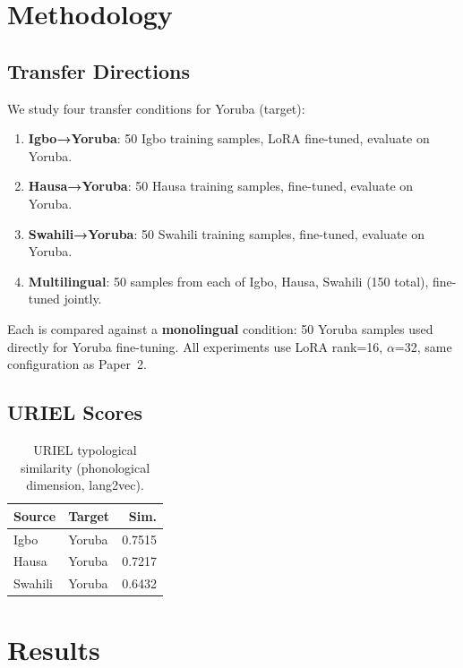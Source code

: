 \documentclass[11pt,a4paper]{article}
\begin{document}
\section{Methodology}
\label{sec:method}

\subsection{Transfer Directions}
We study four transfer conditions for Yoruba (target):
\begin{enumerate}
  \item \textbf{Igbo→Yoruba}: 50 Igbo training samples, LoRA fine-tuned, evaluate on Yoruba.
  \item \textbf{Hausa→Yoruba}: 50 Hausa training samples, fine-tuned, evaluate on Yoruba.
  \item \textbf{Swahili→Yoruba}: 50 Swahili training samples, fine-tuned, evaluate on Yoruba.
  \item \textbf{Multilingual}: 50 samples from each of Igbo, Hausa, Swahili (150 total), fine-tuned jointly.
\end{enumerate}

Each is compared against a \textbf{monolingual} condition: 50 Yoruba samples used directly for Yoruba fine-tuning. All experiments use LoRA rank=16, $\alpha$=32, same configuration as Paper~2.

\subsection{URIEL Scores}

\begin{table}[t]
\centering
\small
\caption{URIEL typological similarity (phonological dimension, lang2vec).}
\label{tab:uriel_full}
\begin{tabular}{llr}
\toprule
\textbf{Source} & \textbf{Target} & \textbf{Sim.} \\
\midrule
Igbo    & Yoruba  & 0.7515 \\
Hausa   & Yoruba  & 0.7217 \\
Swahili & Yoruba  & 0.6432 \\
\bottomrule
\end{tabular}
\end{table}

\section{Results}
\label{sec:results}
\end{document}
